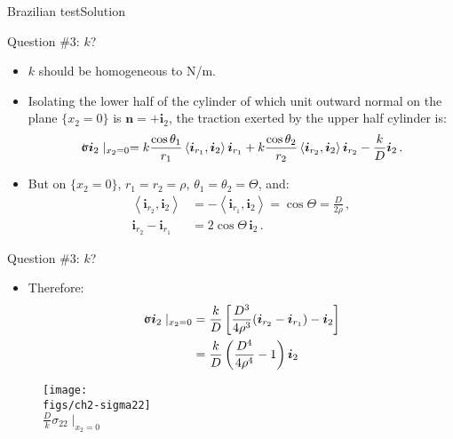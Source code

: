 \documentclass{beamer}
\newcommand{\xj}{x}
\renewcommand{\ij}{i}
\newcommand{\iv}{{\boldsymbol\ij}}
\newcommand{\nj}{n}
\newcommand{\nv}{{\boldsymbol\nj}}
\newcommand*{\stressj}{\sigma}
\newcommand*{\stress}{\mbox{$\hspace{0.3em}\rotatebox[x=0pt,y=0.2pt]{90}{\rule{0.017\linewidth}{0.4pt}}\hspace{-0.25em}\upsigma$}}
\newcommand{\scal}[1]{\left\langle{#1}\right\rangle}
\begin{document}
\begin{frame}{Brazilian test}{Solution}

\begin{overprint}

\vskip-20pt
\begin{exampleblock}{Question \#3: $k$?}
\begin{itemize}
\item $k$ should be homogeneous to N/m.
\item Isolating the lower half of the cylinder of which unit outward normal on the plane $\{\xj_2=0\}$ is $\nv=+\iv_2$, the traction exerted by the upper half cylinder is:
\begin{displaymath}
\stress\iv_2\mid_{\xj_2=0}=k\frac{\cos\theta_1}{r_1}\scal{\iv_{r_1},\iv_2}\iv_{r_1}+k\frac{\cos\theta_2}{r_2}\scal{\iv_{r_2},\iv_2}\iv_{r_2}-\frac{k}{D}\iv_2\,.
\end{displaymath}
\item But on $\{\xj_2=0\}$, $r_1=r_2=\rho$, $\theta_1=\theta_2=\Theta$, and:
\begin{displaymath}
\begin{split}
\scal{\iv_{r_2},\iv_2} &=-\scal{\iv_{r_1},\iv_2}=\cos\Theta=\frac{D}{2\rho}\,, \\
\iv_{r_2}-\iv_{r_1} &=2\cos\Theta\,\iv_2\,.
\end{split}
\end{displaymath}
\end{itemize}
\end{exampleblock}

\vskip-20pt
\begin{exampleblock}{Question \#3: $k$?}
\begin{itemize}
\item Therefore:
\vskip-10pt
\begin{displaymath}
\begin{split}
\stress\iv_2\mid_{\xj_2=0} &=\frac{k}{D}\left[\frac{D^3}{4\rho^3}(\iv_{r_2}-\iv_{r_1})-\iv_2\right] \\
&=\frac{k}{D}\left(\frac{D^4}{4\rho^4}-1\right)\iv_2
\end{split}
\end{displaymath}
\end{itemize}
\vskip-15pt
\begin{figure}
\centering\texttt{[image: \\figs/ch2-sigma22]}\\
$\frac{D}{k}\stressj_{22}\mid_{\xj_2=0}$
\end{figure}
\end{exampleblock}


\end{overprint}
\end{frame}
\end{document}
